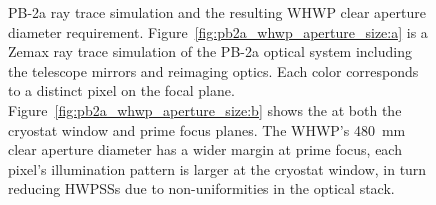 \begin{figure}[!t]
    \centering
    \hfill
    \caption[PB-2a ray trace simulation and the resulting WHWP clear aperture diameter requirement.]{PB-2a ray trace simulation and the resulting WHWP clear aperture diameter requirement. Figure~\ref{fig:pb2a_whwp_aperture_size:a} is a Zemax ray trace simulation of the PB-2a optical system including the telescope mirrors and reimaging optics. Each color corresponds to a distinct pixel on the focal plane. Figure~\ref{fig:pb2a_whwp_aperture_size:b} shows the  at both the cryostat window and prime focus planes. The WHWP's 480~mm clear aperture diameter has a wider margin at prime focus, each pixel's illumination pattern is larger at the cryostat window, in turn reducing HWPSSs due to non-uniformities in the optical stack.}
    \label{fig:pb2a_whwp_aperture_size}
\end{figure}

